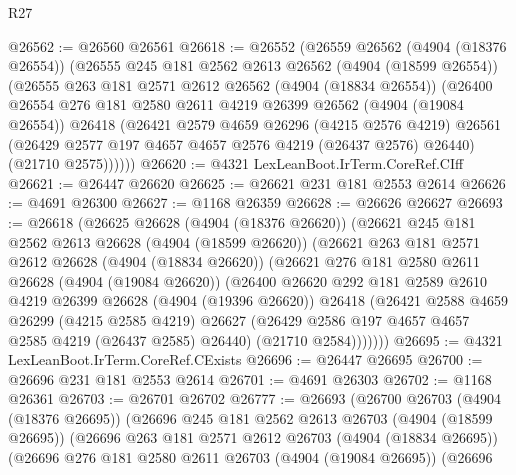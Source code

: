 \begin{lexlean}{R27}
\begin{coremodule}
@26562 := @26560 @26561
@26618 := @26552
    (@26559
      @26562
      (@4904 (@18376 @26554))
      (@26555
        @245
        @181
        @2562
        @2613
        @26562
        (@4904 (@18599 @26554))
        (@26555
          @263
          @181
          @2571
          @2612
          @26562
          (@4904 (@18834 @26554))
          (@26400
            @26554
            @276
            @181
            @2580
            @2611
            @4219
            @26399
            @26562
            (@4904 (@19084 @26554))
            @26418
            (@26421
              @2579
              @4659
              @26296
              (@4215 @2576 @4219)
              @26561
              (@26429 @2577 @197 @4657 @4657 @2576 @4219 (@26437 @2576) @26440)
              (@21710 @2575))))))
@26620 := @4321 LexLeanBoot.IrTerm.CoreRef.CIff
@26621 := @26447 @26620
@26625 := @26621 @231 @181 @2553 @2614
@26626 := @4691 @26300
@26627 := @1168 @26359
@26628 := @26626 @26627
@26693 := @26618
    (@26625
      @26628
      (@4904 (@18376 @26620))
      (@26621
        @245
        @181
        @2562
        @2613
        @26628
        (@4904 (@18599 @26620))
        (@26621
          @263
          @181
          @2571
          @2612
          @26628
          (@4904 (@18834 @26620))
          (@26621
            @276
            @181
            @2580
            @2611
            @26628
            (@4904 (@19084 @26620))
            (@26400
              @26620
              @292
              @181
              @2589
              @2610
              @4219
              @26399
              @26628
              (@4904 (@19396 @26620))
              @26418
              (@26421
                @2588
                @4659
                @26299
                (@4215 @2585 @4219)
                @26627
                (@26429 @2586 @197 @4657 @4657 @2585 @4219 (@26437 @2585) @26440)
                (@21710 @2584)))))))
@26695 := @4321 LexLeanBoot.IrTerm.CoreRef.CExists
@26696 := @26447 @26695
@26700 := @26696 @231 @181 @2553 @2614
@26701 := @4691 @26303
@26702 := @1168 @26361
@26703 := @26701 @26702
@26777 := @26693
    (@26700
      @26703
      (@4904 (@18376 @26695))
      (@26696
        @245
        @181
        @2562
        @2613
        @26703
        (@4904 (@18599 @26695))
        (@26696
          @263
          @181
          @2571
          @2612
          @26703
          (@4904 (@18834 @26695))
          (@26696
            @276
            @181
            @2580
            @2611
            @26703
            (@4904 (@19084 @26695))
            (@26696

\end{coremodule}
\end{lexlean}
